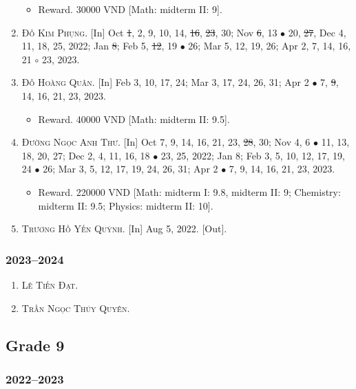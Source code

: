 \documentclass{article}
\begin{document}
\begin{enumerate}
	\begin{itemize}
		\item \textsf{Reward.} 30000 VND [Math: midterm II: 9].
	\end{itemize}
	\item \textsc{Đỗ Kim Phụng.} \textsf{[In]} Oct \st{1}, 2, 9, 10, 14, \st{16}, \st{23}, 30; Nov \st{6}, 13 $\bullet$ 20, \st{27}, Dec 4, 11, 18, 25, 2022; Jan \st{8}; Feb 5, \st{12}, 19 $\bullet$ 26; Mar 5, 12, 19, 26; Apr 2, 7, 14, 16, 21 $\circ$ 23, 2023.
	\item \textsc{Đỗ Hoàng Quân.} \textsf{[In]} Feb 3, 10, 17, 24; Mar 3, 17, 24, 26, 31; Apr 2 $\bullet$ 7, \st{9}, 14, 16, 21, 23, 2023.
	\begin{itemize}
		\item \textsf{Reward.} 40000 VND [Math: midterm II: 9.5].
	\end{itemize}
	\item \textsc{Đường Ngọc Anh Thư.} \textsf{[In]} Oct 7, 9, 14, 16, 21, 23, \st{28}, 30; Nov 4, 6 $\bullet$ 11, 13, 18, 20, 27; Dec 2, 4, 11, 16, 18 $\bullet$ 23, 25, 2022; Jan 8; Feb 3, 5, 10, 12, 17, 19, 24 $\bullet$ 26; Mar 3, 5, 12, 17, 19, 24, 26, 31; Apr 2 $\bullet$ 7, 9, 14, 16, 21, 23, 2023.
	\begin{itemize}
		\item \textsf{Reward.} 220000 VND [Math: midterm I: 9.8, midterm II: 9; Chemistry: midterm II: 9.5; Physics: midterm II: 10].
	\end{itemize}
	\item \textsc{Trương Hồ Yến Quỳnh.} \textsf{[In]} Aug 5, 2022. \textsf{[Out]}.
\end{enumerate}

\subsubsection{2023--2024}

\begin{enumerate}
	\item \textsc{Lê Tiến Đạt.}
	\item \textsc{Trần Ngọc Thúy Quyên.}
\end{enumerate}

\subsection{Grade 9}

\subsubsection{2022--2023}
\end{document}
